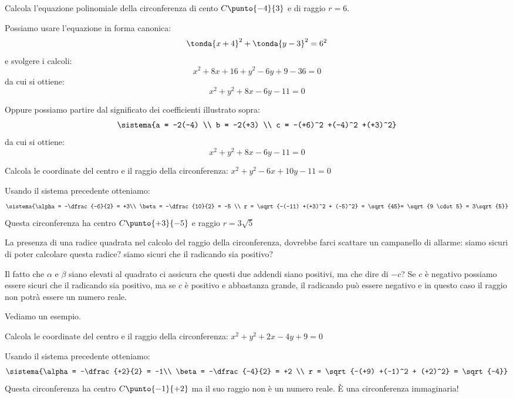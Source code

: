 \begin{esempio}
Calcola l'equazione polinomiale della circonferenza di cento \(C\punto{-4}{3}\) 
e di raggio \(r=6\).

Possiamo usare l'equazione in forma canonica:
\[\tonda{x+4}^2 + \tonda{y-3}^2 = 6^2\]
e svolgere i calcoli:
\[x^2 +8x+16 +y^2 -6y +9 -36 = 0\]
da cui si ottiene:
\[x^2 +y^2 +8x -6y -11 = 0\]

Oppure possiamo partire dal significato dei coefficienti illustrato sopra:
\[\sistema{a = -2(-4) \\ b = -2(+3) \\ c = -(+6)^2 +(-4)^2 +(+3)^2}\]
da cui si ottiene:
\[x^2 +y^2 +8x -6y -11 = 0\]
\end{esempio}

\begin{esempio}
Calcola le coordinate del centro e il raggio della circonferenza:
\(x^2 +y^2 -6x + 10y -11 = 0\)

Usando il sistema precedente otteniamo:
\[\sistema{\alpha = -\dfrac{-6}{2} = +3\\ 
           \beta = -\dfrac{10}{2} = -5 \\ 
           r = \sqrt{-(-11) +(+3)^2 + (-5)^2} = \sqrt{45}= 
               \sqrt{9 \cdot 5} = 3\sqrt{5}}\]
Questa circonferenza ha centro \(C\punto{+3}{-5}\) e raggio \(r=3\sqrt{5}\)
\end{esempio}

\begin{osservazione}
La presenza di una radice quadrata nel calcolo del raggio della circonferenza, 
dovrebbe farci scattare un campanello di allarme: siamo sicuri di poter 
calcolare questa radice? siamo sicuri che il radicando sia positivo?

Il fatto che \(\alpha\) e \(\beta\) siano elevati al quadrato ci assicura che 
questi due addendi siano positivi, ma che dire di \(-c\)? Se \(c\) è negativo 
possiamo essere sicuri che il radicando sia positivo, ma se \(c\) è positivo e 
abbastanza grande, il radicando può essere negativo e in questo caso il raggio 
non potrà essere un numero reale.
\end{osservazione}

Vediamo un esempio.

\begin{esempio}
Calcola le coordinate del centro e il raggio della circonferenza:
\(x^2 +y^2 +2x -4y +9 = 0\)

Usando il sistema precedente otteniamo:
\[\sistema{\alpha = -\dfrac{+2}{2} = -1\\ 
           \beta = -\dfrac{-4}{2} = +2 \\ 
           r = \sqrt{-(+9) +(-1)^2 + (+2)^2} = \sqrt{-4}}\]
Questa circonferenza ha centro \(C\punto{-1}{+2}\) ma il suo raggio non è un 
numero reale. È una circonferenza immaginaria!
\end{esempio}

